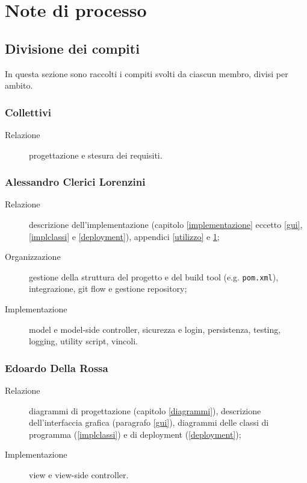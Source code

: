 \chapter{Note di processo}\label{processo}




\section{Divisione dei compiti}
In questa sezione sono raccolti i compiti svolti da ciascun membro, divisi per ambito.


\subsection{Collettivi}
\begin{description}
	\item[Relazione] progettazione e stesura dei requisiti.
\end{description}


\subsection{Alessandro Clerici Lorenzini}
\begin{description}
	\item[Relazione] descrizione dell'implementazione (capitolo \ref{implementazione} eccetto \ref{gui}, \ref{implclassi} e \ref{deployment}), appendici \ref{utilizzo} e \ref{processo};
	\item[Organizzazione] gestione della struttura del progetto e del build tool (e.g. \verb!pom.xml!), integrazione, git flow e gestione repository;
	\item[Implementazione] model e model-side controller, sicurezza e login, persistenza, testing, logging, utility script, vincoli.
\end{description}


\subsection{Edoardo Della Rossa}
\begin{description}
	\item[Relazione] diagrammi di progettazione (capitolo \ref{diagrammi}), descrizione dell'interfaccia grafica (paragrafo \ref{gui}), diagrammi delle classi di programma (\ref{implclassi}) e di deployment (\ref{deployment});
	\item[Implementazione] view e view-side controller.
\end{description}




